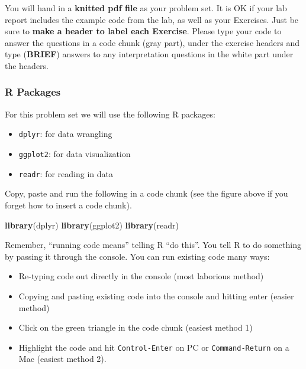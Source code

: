\documentclass[]{article}
\newenvironment{Shaded}{\begin{snugshade}}{\end{snugshade}}
\newcommand{\KeywordTok}[1]{\textcolor[rgb]{0.13,0.29,0.53}{\textbf{#1}}}
\newcommand{\NormalTok}[1]{#1}
\providecommand{\tightlist}{%
  \setlength{\itemsep}{0pt}\setlength{\parskip}{0pt}}
\begin{document}
You will hand in a \textbf{knitted pdf file} as your problem set. It is
OK if your lab report includes the example code from the lab, as well as
your Exercises. Just be sure to \textbf{make a header to label each
Exercise}. Please type your code to answer the questions in a code chunk
(gray part), under the exercise headers and type (\textbf{BRIEF})
answers to any interpretation questions in the white part under the
headers.

\hypertarget{r-packages}{%
\subsubsection{R Packages}\label{r-packages}}

For this problem set we will use the following R packages:

\begin{itemize}
\tightlist
\item
  \texttt{dplyr}: for data wrangling
\item
  \texttt{ggplot2}: for data visualization
\item
  \texttt{readr}: for reading in data
\end{itemize}

Copy, paste and run the following in a code chunk (see the figure above
if you forget how to insert a code chunk).

\begin{Shaded}
\begin{Highlighting}[]
\KeywordTok{library}\NormalTok{(dplyr)}
\KeywordTok{library}\NormalTok{(ggplot2)}
\KeywordTok{library}\NormalTok{(readr)}
\end{Highlighting}
\end{Shaded}

Remember, ``running code means'' telling R ``do this''. You tell R to do
something by passing it through the console. You can run existing code
many ways:

\begin{itemize}
\tightlist
\item
  Re-typing code out directly in the console (most laborious method)
\item
  Copying and pasting existing code into the console and hitting enter
  (easier method)
\item
  Click on the green triangle in the code chunk (easiest method 1)
\item
  Highlight the code and hit \texttt{Control-Enter} on PC or
  \texttt{Command-Return} on a Mac (easiest method 2).
\end{itemize}
\end{document}
